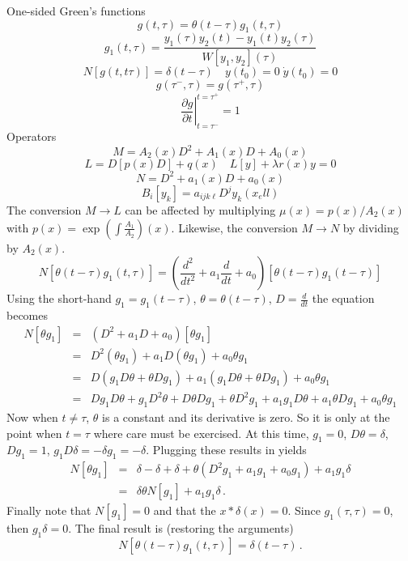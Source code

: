 One-sided Green's functions
\[
  g(t,\tau) = \theta(t-\tau) g_1(t,\tau)
\]
\[
  g_1(t,\tau) = \frac{ y_1(\tau) y_2(t) - y_1(t) y_2(\tau) }{ W[y_1,y_2](\tau) }
\]
\[
  N[g(t,t\tau)] = \delta(t-\tau) \quad y(t_0) = 0 \; {\dot y}(t_0) = 0 
\]
\[
  g(\tau^{-},\tau) = g(\tau^{+},\tau)
\]
\[
  \left. \frac{\partial g}{\partial t} \right|^{t=\tau^{+}}_{t=\tau^{-}} = 1
\]
Operators
\[
  M = A_2(x) D^2 + A_1(x) D + A_0(x)
\]
\[
  L = D[ p(x) D] + q(x) \quad L[y] + \lambda r(x) y = 0
\]
\[
  N = D^2 + a_1(x) D + a_0(x)
\]
\[
  B_i[y_k] = a_{ijk\ell} D^j y_k(x_ell)
\]
The conversion $M \rightarrow L$ can be affected by multiplying $\mu(x) = 
p(x)/A_2(x)$ with $p(x) = \exp\left( \int \frac{A_1}{A_2} \right)(x)$.  
Likewise, the conversion $M \rightarrow N$ by dividing by $A_2(x)$.
\[
  N[ \theta(t-\tau) g_1(t,\tau) ] =  \left( \frac{d^2}{d t^2} + a_1 \frac{d}{dt} + a_0 \right) 
                                     [\theta(t-\tau) g_1(t-\tau) ] 
\]
Using the short-hand $g_1 = g_1(t-\tau)$, $\theta = \theta(t-\tau)$, 
$D = \frac{d}{dt}$ the equation becomes
\begin{eqnarray*}
  N[\theta g_1] & = & (D^2 + a_1 D + a_0)[\theta g_1] \\
                & = & D^2(\theta g_1) + a_1 D(\theta g_1) + a_0 \theta g_1\\
                & = & D(g_1 D\theta + \theta D g_1) + a_1 (g_1 D \theta + \theta D g_1 ) + a_0 \theta g_1 \\
                & = & D g_1 D \theta + g_1 D^2 \theta + D\theta Dg_1 
                      + \theta D^2 g_1 + a_1 g_1 D\theta + a_1 \theta Dg_1 + a_0 \theta g_1
\end{eqnarray*}
Now when $t \neq \tau$, $\theta$ is a constant and its derivative is zero.
So it is only at the point when $t = \tau$ where care must be exercised. At 
this time, $g_1 = 0$, $D \theta = \delta$, $Dg_1 = 1$, $g_1 D\delta = -\delta g_1 = -\delta$.
Plugging these results in yields
\begin{eqnarray*}
  N[\theta g_1] & = &   \delta - \delta + \delta 
                      + \theta (D^2 g_1 + a_1 g_1 + a_0 g_1 ) + a_1 g_1 \delta \\
                & = & \delta \theta N[g_1] + a_1 g_1 \delta \, .
\end{eqnarray*}
Finally note that $N[g_1] = 0$ and that the $x*\delta(x) = 0$.  Since $g_1(\tau,\tau) = 0$, 
then $g_1 \delta = 0$.  The final result is (restoring the arguments)
\[
  N[\theta(t-\tau) g_1(t,\tau)] = \delta(t-\tau) \, .
\] 

